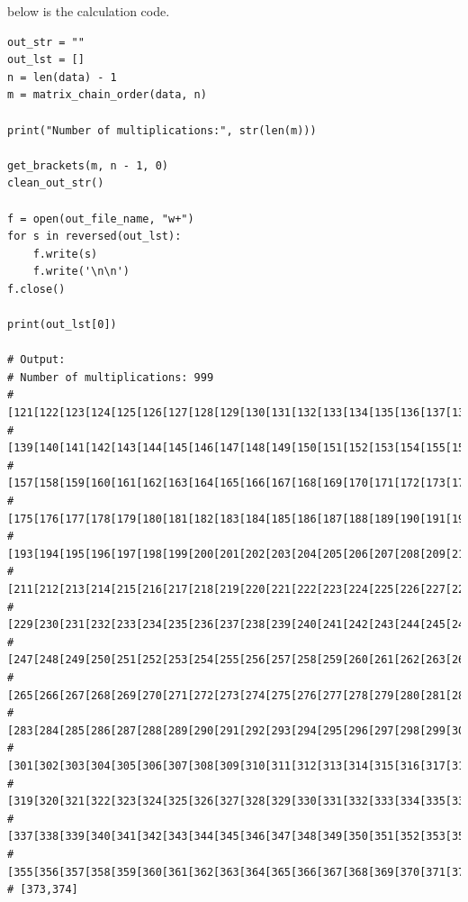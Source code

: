 \documentclass{article}
\begin{document}
\begin{enumerate}
\begin{enumerate}
    below is the calculation code.

    \begin{lstlisting}
out_str = ""
out_lst = []
n = len(data) - 1
m = matrix_chain_order(data, n)

print("Number of multiplications:", str(len(m)))

get_brackets(m, n - 1, 0)
clean_out_str()

f = open(out_file_name, "w+")
for s in reversed(out_lst):
    f.write(s)
    f.write('\n\n')
f.close()

print(out_lst[0])

# Output:
# Number of multiplications: 999
# [121[122[123[124[125[126[127[128[129[130[131[132[133[134[135[136[137[138
# [139[140[141[142[143[144[145[146[147[148[149[150[151[152[153[154[155[156
# [157[158[159[160[161[162[163[164[165[166[167[168[169[170[171[172[173[174
# [175[176[177[178[179[180[181[182[183[184[185[186[187[188[189[190[191[192
# [193[194[195[196[197[198[199[200[201[202[203[204[205[206[207[208[209[210
# [211[212[213[214[215[216[217[218[219[220[221[222[223[224[225[226[227[228
# [229[230[231[232[233[234[235[236[237[238[239[240[241[242[243[244[245[246
# [247[248[249[250[251[252[253[254[255[256[257[258[259[260[261[262[263[264
# [265[266[267[268[269[270[271[272[273[274[275[276[277[278[279[280[281[282
# [283[284[285[286[287[288[289[290[291[292[293[294[295[296[297[298[299[300
# [301[302[303[304[305[306[307[308[309[310[311[312[313[314[315[316[317[318
# [319[320[321[322[323[324[325[326[327[328[329[330[331[332[333[334[335[336
# [337[338[339[340[341[342[343[344[345[346[347[348[349[350[351[352[353[354
# [355[356[357[358[359[360[361[362[363[364[365[366[367[368[369[370[371[372
# [373,374]
    \end{lstlisting}
  \end{enumerate}

  \end{enumerate}  %
\end{document}
